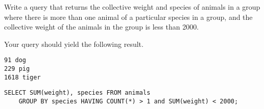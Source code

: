 \begin{blocksection}
\question Write a query that returns the collective weight and species of animals in a group where there is more than one animal of a particular species in a group, and the collective weight of the animals in the group is less than 2000.

Your query should yield the following result.

\begin{lstlisting}
91 dog
229 pig
1618 tiger
\end{lstlisting}

\begin{solution}[1.5in]
\begin{lstlisting}
SELECT SUM(weight), species FROM animals
    GROUP BY species HAVING COUNT(*) > 1 and SUM(weight) < 2000;
\end{lstlisting}
\end{solution}
\end{blocksection}
